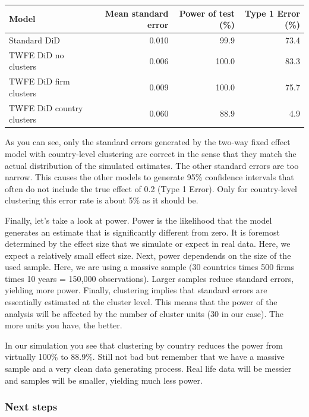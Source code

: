 \documentclass[
  letterpaper,
  DIV=11,
  numbers=noendperiod]{scrartcl}
\begin{document}
\begin{table}
\fontsize{12.0pt}{14.4pt}\selectfont
\begin{tabular*}{\linewidth}{@{\extracolsep{\fill}}lrrr}
\toprule
Model & Mean standard error & Power of test (\%) & Type 1 Error (\%) \\ 
\midrule\addlinespace[2.5pt]
Standard DiD & 0.010 & 99.9 & 73.4 \\ 
TWFE DiD no clusters & 0.006 & 100.0 & 83.3 \\ 
TWFE DiD firm clusters & 0.009 & 100.0 & 75.7 \\ 
TWFE DiD country clusters & 0.060 & 88.9 & 4.9 \\ 
\bottomrule
\end{tabular*}
\end{table}

As you can see, only the standard errors generated by the two-way fixed
effect model with country-level clustering are correct in the sense that
they match the actual distribution of the simulated estimates. The other
standard errors are too narrow. This causes the other models to generate
95\% confidence intervals that often do not include the true effect of
0.2 (Type 1 Error). Only for country-level clustering this error rate is
about 5\% as it should be.

Finally, let's take a look at power. Power is the likelihood that the
model generates an estimate that is significantly different from zero.
It is foremost determined by the effect size that we simulate or expect
in real data. Here, we expect a relatively small effect size. Next,
power dependends on the size of the used sample. Here, we are using a
massive sample (30 countries times 500 firms times 10 years = 150,000
observations). Larger samples reduce standard errors, yielding more
power. Finally, clustering implies that standard errors are essentially
estimated at the cluster level. This means that the power of the
analysis will be affected by the number of cluster units (30 in our
case). The more units you have, the better.

In our simulation you see that clustering by country reduces the power
from virtually 100\% to 88.9\%. Still not bad but remember that we have
a massive sample and a very clean data generating process. Real life
data will be messier and samples will be smaller, yielding much less
power.

\subsubsection{Next steps}\label{next-steps}
\end{document}
